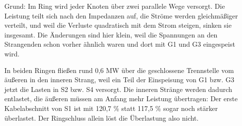 \documentclass[11pt,a4paper]{article}
\begin{document}
Grund: Im Ring wird jeder Knoten über zwei parallele Wege versorgt. Die Leistung teilt sich nach den Impedanzen auf, die Ströme werden gleichmäßiger verteilt, und weil die Verluste quadratisch mit dem Strom steigen, sinken sie insgesamt. Die Änderungen sind hier klein, weil die Spannungen an den Strangenden schon vorher ähnlich waren und dort mit G1 und G3 eingespeist wird.

In beiden Ringen fließen rund 0,6 MW über die geschlossene Trennstelle vom äußeren in den inneren Strang, weil ein Teil der Einspeisung von G1 bzw. G3 jetzt die Lasten in S2 bzw. S4 versorgt. Die inneren Stränge werden dadurch entlastet, die äußeren müssen am Anfang mehr Leistung übertragen: Der erste Kabelabschnitt von S1 ist mit 120,7 \% statt 117,5 \% sogar noch stärker überlastet. Der Ringschluss allein löst die Überlastung also nicht.
\end{document}
